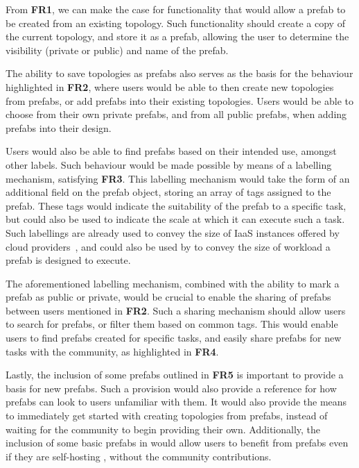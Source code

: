 \documentclass[11pt]{article}
\begin{document}
		From \textbf{FR1}, we can make the case for functionality that would allow a prefab to be created from an existing topology.
		Such functionality should create a copy of the current topology, and store it as a prefab, allowing the user to determine the visibility (private or public) and name of the prefab.

		The ability to save topologies as prefabs also serves as the basis for the behaviour highlighted in \textbf{FR2}, where users would be able to then create new topologies from prefabs, or add prefabs into their existing topologies.
		Users would be able to choose from their own private prefabs, and from all public prefabs, when adding prefabs into their design.

		Users would also be able to find prefabs based on their intended use, amongst other labels. 
		Such behaviour would be made possible by means of a labelling mechanism, satisfying \textbf{FR3}.
		This labelling mechanism would take the form of an additional field on the prefab object, storing an array of tags assigned to the prefab.
		These tags would indicate the suitability of the prefab to a specific task, but could also be used to indicate the scale at which it can execute such a task.
		Such labellings are already used to convey the size of IaaS instances offered by cloud providers~\cite{davatz2017}, and could also be used by \opendc{} to convey the size of workload a prefab is designed to execute.

		The aforementioned labelling mechanism, combined with the ability to mark a prefab as public or private, would be crucial to enable the sharing of prefabs between users mentioned in \textbf{FR2}.
		Such a sharing mechanism should allow users to search for prefabs, or filter them based on common tags.
		This would enable users to find prefabs created for specific tasks, and easily share prefabs for new tasks with the community, as highlighted in \textbf{FR4}.

		Lastly, the inclusion of some \opendc{} prefabs outlined in \textbf{FR5} is important to provide a basis for new prefabs.
		Such a provision would also provide a reference for how prefabs can look to users unfamiliar with them.
		It would also provide the means to immediately get started with creating topologies from prefabs, instead of waiting for the community to begin providing their own.
		Additionally, the inclusion of some basic prefabs in \opendc{} would allow users to benefit from prefabs even if they are self-hosting \opendc{}, without the community contributions.
\end{document}
